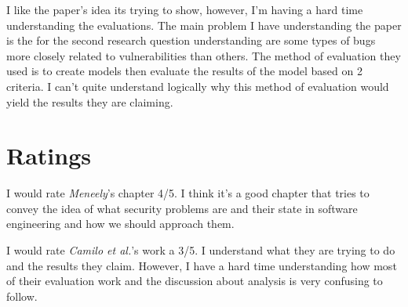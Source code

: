 \documentclass[sigconf]{acmart}
\begin{document}
I like the paper's idea its trying to show, however, I'm having a hard time understanding the evaluations. The main problem I have understanding the paper is the for the second research question understanding are some types of bugs more closely related to vulnerabilities than others. The method of evaluation they used is to create models then evaluate the results of the model based on 2 criteria. I can't quite understand logically why this method of evaluation would yield the results they are claiming. 

\section{Ratings}
I would rate {\it Meneely}'s chapter 4/5. I think it's a good chapter that tries to convey the idea of what security problems are and their state in software engineering and how we should approach them. 

I would rate {\it Camilo et al.}'s work a 3/5. I understand what they are trying to do and the results they claim. However, I have a hard time understanding how  most of their evaluation work and the discussion about analysis is very confusing to follow. 
\end{document}
